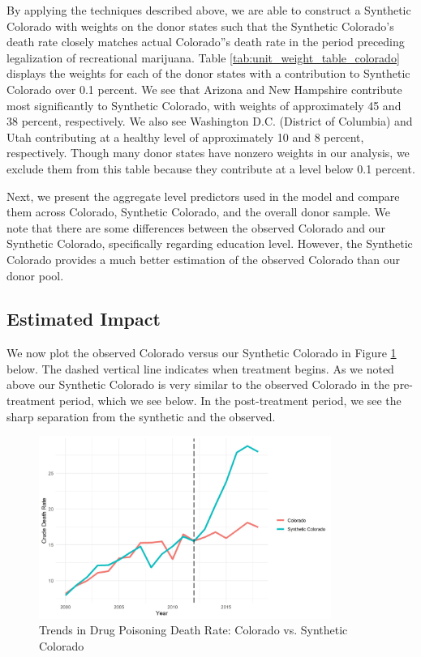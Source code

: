 \documentclass{article}
\begin{document}
By applying the techniques described above, we are able to construct a Synthetic Colorado with weights on the donor states such that the Synthetic Colorado's death rate closely matches actual Colorado''s death rate in the period preceding legalization of recreational marijuana. Table \ref{tab:unit_weight_table_colorado} displays the weights for each of the donor states with a contribution to Synthetic Colorado over 0.1 percent. We see that Arizona and New Hampshire contribute most significantly to Synthetic Colorado, with weights of approximately 45 and 38 percent, respectively. We also see Washington D.C. (District of Columbia) and Utah contributing at a healthy level of approximately 10 and 8 percent, respectively. Though many donor states have nonzero weights in our analysis, we exclude them from this table because they contribute at a level below 0.1 percent.



Next, we present the aggregate level predictors used in the model and compare them across Colorado, Synthetic Colorado, and the overall donor sample. We note that there are some differences between the observed Colorado and our Synthetic Colorado, specifically regarding education level. However, the Synthetic Colorado provides a much better estimation of the observed Colorado than our donor pool. 



\subsection{Estimated Impact}

We now plot the observed Colorado versus our Synthetic Colorado in Figure \ref{fig:trends_plot_colorado} below. The dashed vertical line indicates when treatment begins. As we noted above our Synthetic Colorado is very similar to the observed Colorado in the pre-treatment period, which we see below. In the post-treatment period, we see the sharp separation from the synthetic and the observed. 

\begin{figure}[H]
	\begin{center}
		\includegraphics[width=0.85\textwidth]{trends_plot_colorado}
	\end{center}
	\caption{Trends in Drug Poisoning Death Rate: Colorado vs. Synthetic Colorado}
	\label{fig:trends_plot_colorado}
\end{figure}
\end{document}
